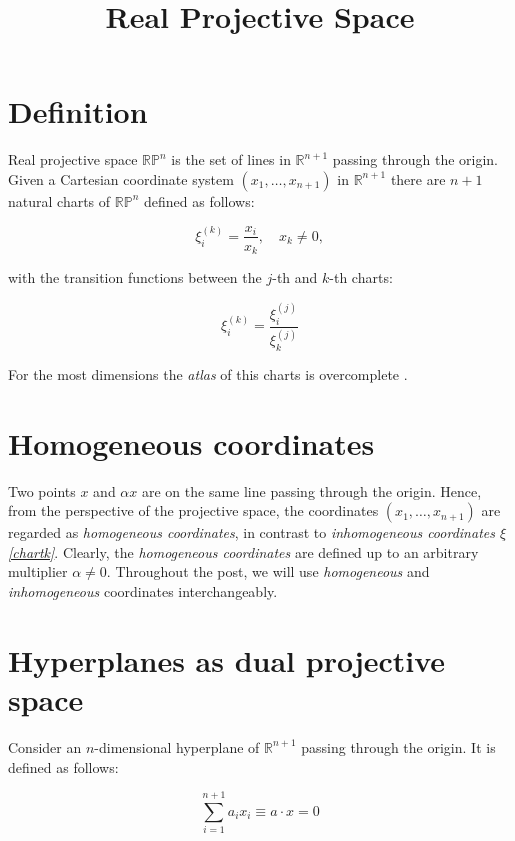 \documentclass[a4paper,10pt]{article}
\title{Real Projective Space}
\author{}
\date{}
\begin{document}
\maketitle
\section{Definition}

Real projective space $\mathbb{RP}^n$ is the set of lines in $\mathbb{R}^{n+1}$ passing through the origin. Given a Cartesian coordinate system $(x_1,\ldots, x_{n+1})$ in $\mathbb{R}^{n+1}$ there are $n+1$ natural charts of $\mathbb{RP}^n$ defined as follows:

\begin{equation}
 \xi_i^{(k)} = \frac{x_i}{x_k}, \quad x_k\neq 0 \label{chartk},
\end{equation}

with the transition functions between the $j$-th and $k$-th charts:

\begin{equation}
 \xi^{(k)}_i = \frac{\xi^{(j)}_i }{\xi^{(j)}_k }
\end{equation}

For the most dimensions the {\it atlas } of this charts is overcomplete \cite{mhopkins}.

\section{Homogeneous coordinates}

Two points $x$ and $\alpha x$ are on the same line passing through the origin. Hence, from the perspective of the projective space, the coordinates $(x_1, \ldots, x_{n+1})$ are regarded as {\it homogeneous coordinates}, in contrast to {\it inhomogeneous coordinates $\xi$ \eqref{chartk}}. Clearly, the {\it homogeneous coordinates} are defined up to an arbitrary multiplier $\alpha \neq 0$. Throughout the post, we will use {\it homogeneous}  and {\it inhomogeneous} coordinates interchangeably.

\section{Hyperplanes as dual projective space}

Consider an $n$-dimensional hyperplane of $\mathbb{R}^{n+1}$ passing through the origin. It is defined as follows:

\begin{equation}
 \sum\limits_{i=1}^{n+1} a_i x_i \equiv a\cdot x = 0\label{hyperplane}
\end{equation}
\end{document}
